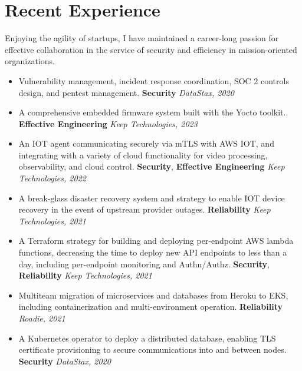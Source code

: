 \documentclass[letterpaper,10pt]{article}
\begin{document}

\section{Recent Experience}
Enjoying the agility of startups, I have maintained a
career-long passion for effective collaboration in the service of security and efficiency in mission-oriented organizations.
\begin{itemize}
	\item Vulnerability management, incident response coordination, SOC 2 controls design, and pentest management. \textbf{Security} \textit{DataStax, 2020}
	      \setlength\itemsep{0.1em} \item A comprehensive embedded firmware system
	      built with the Yocto toolkit.. \textbf{Effective Engineering} \textit{Keep Technologies, 2023}
	\item An IOT agent communicating securely via mTLS with AWS IOT, and integrating with a variety of cloud functionality for video processing, observability, and cloud control. \textbf{Security}, \textbf{Effective Engineering} \textit{Keep Technologies, 2022}
	\item A break-glass disaster recovery system and strategy to enable IOT device recovery in the event of upstream provider outages. \textbf{Reliability} \textit{Keep Technologies, 2021}
	\item A Terraform strategy for building and deploying per-endpoint AWS lambda functions, decreasing the time to deploy new API endpoints to less than a day, including per-endpoint monitoring and Authn/Authz. \textbf{Security}, \textbf{Reliability} \textit{Keep Technologies, 2021}
	\item Multiteam migration of microservices and databases from Heroku to EKS, including containerization and multi-environment operation. \textbf{Reliability} \textit{Roadie, 2021}
	\item A Kubernetes operator to deploy a distributed database, enabling TLS certificate provisioning to secure communications into and between nodes. \textbf{Security} \textit{DataStax, 2020}
\end{itemize}
\end{document}
